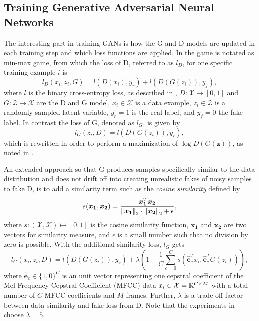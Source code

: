 \subsection{Training Generative Adversarial Neural Networks}\label{sec:nn_adv_train}
The interesting part in training GANs is how the G and D models are updated in each training step and which loss functions are applied.
In  the game is notated as min-max game, from which the loss of D, referred to as $l_D$, for one specific training example $i$ is
\begin{equation}
  l_D(x_i, z_i, G) = l(D(x_i), y_r) + l(D(G(z_i)), y_f),
\end{equation}
where $l$ is the binary cross-entropy loss, as described in , $D: \mathcal{X} \mapsto [0, 1]$ and $G: \mathcal{Z} \mapsto \mathcal{X}$ are the D and G model, $x_i \in \mathcal{X}$ is a data example, $z_i \in \mathcal{Z}$ is a randomly sampled latent variable, $y_r = 1$ is the real label, and $y_f = 0$ the fake label.
In contrast the loss of G, denoted as $l_G$, is given by
\begin{equation}
  l_G(z_i, D) =  l(D(G(z_i)), y_r),
\end{equation}
which is rewritten in order to perform a maximization of $\log D(G(\bm{z}))$, as noted in .

An extended approach so that G produces samples specifically similar to the data distribution and does not drift off into creating unrealistic fakes of noisy samples to fake D, is to add a similarity term such as the \emph{cosine similarity} defined by
\begin{equation}
  s(\bm{x_1}, \bm{x_2}) = \frac{\bm{x_1}^T \bm{x_2}}{\norm{\bm{x_1}}_2 \cdot \norm{\bm{x_2}}_2 + \epsilon},
\end{equation}
where $s : (\mathcal{X}, \mathcal{X}) \mapsto [0, 1]$ is the cosine similarity function, $\bm{x_1}$ and $\bm{x_2}$ are two vectors for similarity measure, and $\epsilon$ is a small number such that no division by zero is possible.
With the additional similarity loss, $l_G$ gets
\begin{equation}
  l_G(x_i, z_i, D) =  l(D(G(z_i)), y_r) + \lambda \left(1 - \frac{1}{C} \sum_{c=0}^{C} s(\hat{\bm{e}}_c^T x_i , \hat{\bm{e}}_c^T G(z_i)) \right),
\end{equation}
where $\hat{\bm{e}}_c \in \{1, 0\}^C$ is an unit vector representing one cepstral coefficient of the Mel Frequency Cepstral Coefficient (MFCC) data $x_i \in \mathcal{X} = \mathbb{R}^{C \times M}$ with a total number of $C$ MFCC coefficients and $M$ frames.
Further, $\lambda$ is a trade-off factor between data similarity and fake loss from D.
Note that the experiments in  choose $\lambda = 5$.

